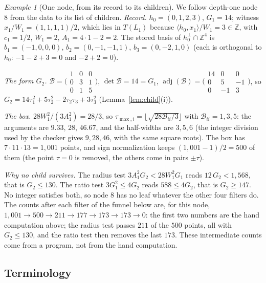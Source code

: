 \documentclass[11pt]{article}
\theoremstyle{remark}
\newtheorem{example}[theorem]{Example}
\newcommand{\Z}{\mathbb{Z}}
\begin{document}
\begin{example}[One node, from its record to its children]\label{ex:node}
We follow depth-one node $8$ from the data to its list of children. \emph{Record.} $h_0=(0,1,2,3)$, $G_1=14$; witness $x_1/W_1=(1,1,1,1)/2$, which lies in $T(L_1)$ because $\langle h_0,x_1\rangle/W_1=3\in\Z$, with $c_1=1/2$, $W_1=2$, $A_1=4\cdot1-2=2$. The stored basis of $h_0^\perp\cap\Z^4$ is $b_1=(-1,0,0,0)$, $b_2=(0,-1,-1,1)$, $b_3=(0,-2,1,0)$ (each is orthogonal to $h_0$: $-1-2+3=0$ and $-2+2=0$).

\emph{The form $G_2$.} $\mathcal B=\bigl(\begin{smallmatrix}1&0&0\\0&3&1\\0&1&5\end{smallmatrix}\bigr)$, $\det\mathcal B=14=G_1$, $\operatorname{adj}(\mathcal B)=\bigl(\begin{smallmatrix}14&0&0\\0&5&-1\\0&-1&3\end{smallmatrix}\bigr)$, so $G_2=14\tau_1^2+5\tau_2^2-2\tau_2\tau_3+3\tau_3^2$ (Lemma~\ref{lem:child}(i)).

\emph{The box.} $28W_1^2/(3A_1^2)=28/3$, so $\tau_{\max,i}=\lfloor\sqrt{28\mathcal B_{ii}/3}\rfloor$ with $\mathcal B_{ii}=1,3,5$: the arguments are $9.33$, $28$, $46.67$, and the half-widths are $3,5,6$ (the integer division used by the checker gives $9,28,46$, with the same square roots). The box has $7\cdot11\cdot13=1{,}001$ points, and sign normalization keeps $(1{,}001-1)/2=500$ of them (the point $\tau=0$ is removed, the others come in pairs $\pm\tau$).

\emph{Why no child survives.} The radius test $3A_1^2G_2<28W_1^2G_1$ reads $12\,G_2<1{,}568$, that is $G_2\le130$. The ratio test $3G_1^2\le4G_2$ reads $588\le4G_2$, that is $G_2\ge147$. No integer satisfies both, so node $8$ has no leaf whatever the other four filters do. The counts after each filter of the funnel below are, for this node, $1{,}001\to500\to211\to177\to173\to173\to0$: the first two numbers are the hand computation above; the radius test passes $211$ of the $500$ points, all with $G_2\le130$, and the ratio test then removes the last $173$. These intermediate counts come from a program, not from the hand computation.
\end{example}

\subsection{Terminology}\label{sec:terms}
\end{document}
